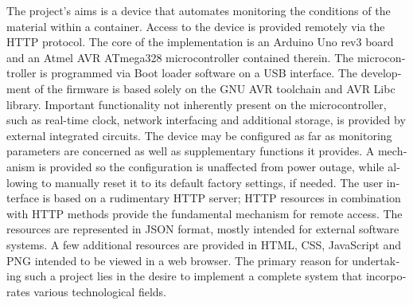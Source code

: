 \begin{english}
\noindent
The project's aims is a device that automates monitoring the conditions of the
material within a container. Access to the device is provided remotely via the
HTTP protocol.
%
The core of the implementation is an Arduino Uno rev3 board and an Atmel AVR
ATmega328 microcontroller contained therein. The microcontroller is programmed
via Boot loader software on a USB interface. The development of the firmware is
based solely on the GNU AVR toolchain and AVR Libc library. Important
functionality not inherently present on the microcontroller, such as real-time
clock, network interfacing and additional storage, is provided by external
integrated circuits.
%
The device may be configured as far as monitoring parameters are concerned
as well as supplementary functions it provides. A mechanism is provided so the
configuration is unaffected from power outage, while allowing to manually reset
it to its default factory settings, if needed.
%
The user interface is based on a rudimentary HTTP server; HTTP resources in
combination with HTTP methods provide the fundamental mechanism for remote
access. The resources are represented in JSON format, mostly intended for
external software systems. A few additional resources are provided in HTML, CSS,
JavaScript and PNG intended to be viewed in a web browser.
%
The primary reason for undertaking such a project lies in the desire to
implement a complete system that incorporates various technological fields.
\end{english}

\clearpage
